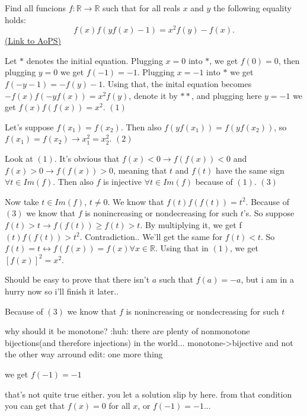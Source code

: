 \begin{problem}
	Find all funcions $ f: \mathbb{R}\to\mathbb{R}$ such that for all reals $ x$ and $ y$ the following equality holds:
\[f(x)f(yf(x)-1)=x^{2}f(y)-f(x).\]
	\flushright \href{https://artofproblemsolving.com/community/c6h156055}{(Link to AoPS)}
\end{problem}



\begin{mysolution}
	Let $ *$ denotes the initial equation.
Plugging $ x=0$ into $ *$, we get $ f(0)=0$,
 then plugging $ y=0$ we get $ f(-1)=-1$.
Plugging $ x=-1$ into $ *$ we get $ f(-y-1)=-f(y)-1$. 
Using that, the inital equation becomes $ -f(x)f(-yf(x))=x^{2}f(y)$, denote it by $ **$, 
and plugging here $ y=-1$ we get $ f(x)f(f(x))=x^{2}$.  $ (1)$

Let's suppose $ f(x_{1})=f(x_{2})$. Then also $ f(yf(x_{1}))=f(yf(x_{2}))$, so $ f(x_{1})=f(x_{2})\rightarrow x_{1}^{2}=x_{2}^{2}$. $ (2)$ 

Look at $ (1)$. It's obvious that $ f(x)<0\rightarrow f(f(x))<0$ and $ f(x)>0\rightarrow f(f(x))>0$, meaning that $ t$ and $ f(t)$ have the same sign $ \forall t\in Im(f)$.
Then also $ f$ is injective $ \forall t\in Im(f)$ because of $ (1)$. $ (3)$
 
Now take $ t\in Im(f)$, $ t\not=0$. We know that $ f(t)f(f(t))=t^{2}$. Because of $ (3)$ we know that $ f$ is nonincreasing or nondecreasing for such $ t$'s. So suppose $ f(t)>t \rightarrow f(f(t))\geq f(t)>t$. By multiplying it, we get f$ (t)f(f(t))>t^{2}.$ Contradiction.. We'll get the same for $ f(t)<t$. So $ f(t)=t\longleftrightarrow f(f(x))=f(x) \forall x \in \mathbb{R}$.
Using that in $ (1)$, we get $ [f(x)]^{2}=x^{2}$.

Should be easy to prove that there isn't $ a$ such that $ f(a)=-a$, but i am in a hurry now so i'll finish it later..
\end{mysolution}



\begin{mysolution}
	\begin{tcolorbox} Because of $ (3)$ we know that $ f$ is nonincreasing or nondecreasing for such $ t$\end{tcolorbox}
why should it be monotone? :huh:  there are plenty of nonmonotone bijections(and therefore injections) in the world...
monotone->bijective and not the other way arround
edit:
one more thing
\begin{tcolorbox}we get $ f(-1)=-1$\end{tcolorbox}
that's not quite true either. you let a solution slip by here. from that condition you can get that $ f(x)=0$ for all $ x$, or $ f(-1)=-1$...
\end{mysolution}



